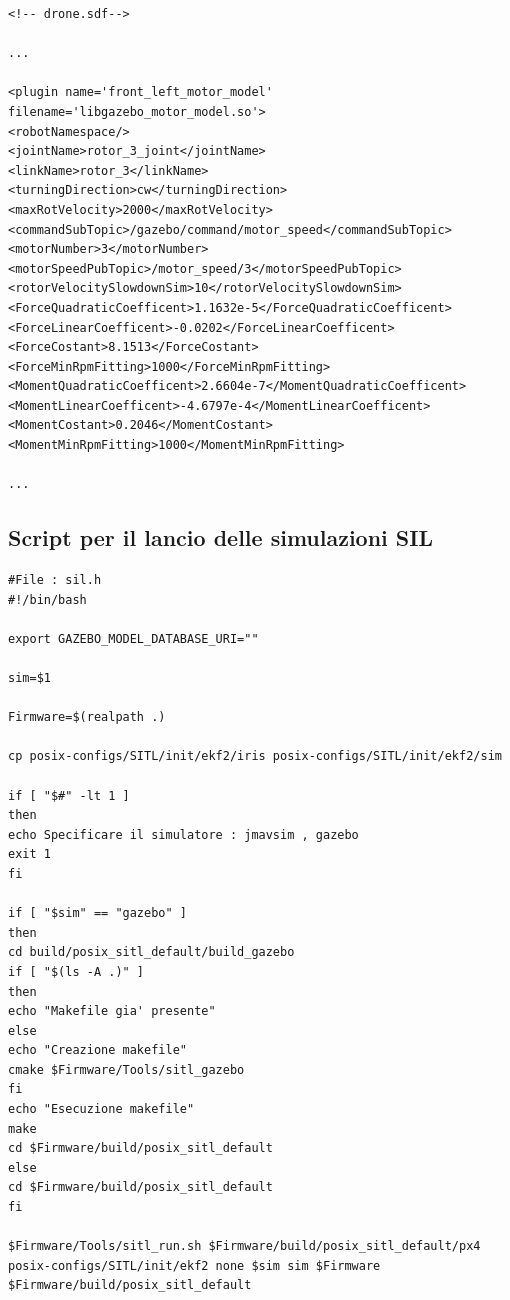 \lstset{language=XML}
\begin{lstlisting}
<!-- drone.sdf-->

...

<plugin name='front_left_motor_model' filename='libgazebo_motor_model.so'>
<robotNamespace/>
<jointName>rotor_3_joint</jointName>
<linkName>rotor_3</linkName>
<turningDirection>cw</turningDirection>
<maxRotVelocity>2000</maxRotVelocity>
<commandSubTopic>/gazebo/command/motor_speed</commandSubTopic>
<motorNumber>3</motorNumber>
<motorSpeedPubTopic>/motor_speed/3</motorSpeedPubTopic>
<rotorVelocitySlowdownSim>10</rotorVelocitySlowdownSim>
<ForceQuadraticCoefficent>1.1632e-5</ForceQuadraticCoefficent>
<ForceLinearCoefficent>-0.0202</ForceLinearCoefficent>
<ForceCostant>8.1513</ForceCostant>
<ForceMinRpmFitting>1000</ForceMinRpmFitting>
<MomentQuadraticCoefficent>2.6604e-7</MomentQuadraticCoefficent>
<MomentLinearCoefficent>-4.6797e-4</MomentLinearCoefficent>
<MomentCostant>0.2046</MomentCostant>
<MomentMinRpmFitting>1000</MomentMinRpmFitting>

...

\end{lstlisting}

\subsection{Script per il lancio delle simulazioni SIL}

\lstset{language=bash}
\begin{lstlisting}
#File : sil.h
#!/bin/bash

export GAZEBO_MODEL_DATABASE_URI=""

sim=$1

Firmware=$(realpath .)

cp posix-configs/SITL/init/ekf2/iris posix-configs/SITL/init/ekf2/sim

if [ "$#" -lt 1 ]
then
echo Specificare il simulatore : jmavsim , gazebo
exit 1
fi

if [ "$sim" == "gazebo" ] 
then
cd build/posix_sitl_default/build_gazebo
if [ "$(ls -A .)" ]
then
echo "Makefile gia' presente"
else
echo "Creazione makefile"
cmake $Firmware/Tools/sitl_gazebo
fi
echo "Esecuzione makefile"
make
cd $Firmware/build/posix_sitl_default
else
cd $Firmware/build/posix_sitl_default
fi

$Firmware/Tools/sitl_run.sh $Firmware/build/posix_sitl_default/px4  posix-configs/SITL/init/ekf2 none $sim sim $Firmware $Firmware/build/posix_sitl_default
\end{lstlisting}

